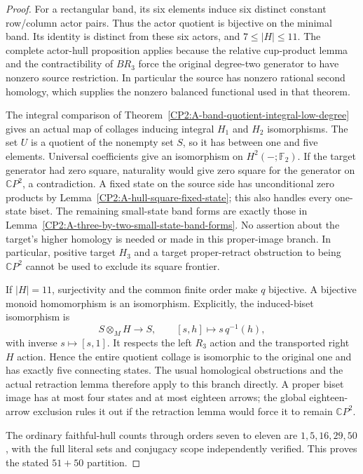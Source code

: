 \begin{proof}
For a rectangular band, its six elements induce six distinct constant
row/column actor pairs.  Thus the actor quotient is bijective on the
minimal band.  Its identity is distinct from these six actors, and
$7\leq|H|\leq11$.  The complete actor-hull proposition applies because
the relative cup-product lemma and the contractibility of $BR_3$
force the original degree-two generator to have nonzero source
restriction.  In particular the source has
nonzero rational second homology, which supplies the nonzero balanced
functional used in that theorem.

The integral comparison of
Theorem~\ref{CP2:A-band-quotient-integral-low-degree} gives an actual
map of collages inducing integral $H_1$ and $H_2$ isomorphisms.
The set $U$ is a quotient of the nonempty set $S$, so it has between
one and five elements.  Universal coefficients give an isomorphism
on $H^2(-;\mathbb F_2)$.  If the target generator had zero square,
naturality would give zero square for the generator on
$\mathbb CP^2$, a contradiction.  A fixed state on the source side
has unconditional zero products by
Lemma~\ref{CP2:A-hull-square-fixed-state}; this also handles every
one-state biset.  The remaining small-state band forms are exactly
those in Lemma~\ref{CP2:A-three-by-two-small-state-band-forms}.
No assertion about the target's higher homology is needed or made
in this proper-image branch.  In particular, positive target
$H_3$ and a target proper-retract obstruction to being
$\mathbb CP^2$ cannot be used to exclude its square frontier.

If $|H|=11$, surjectivity and the common finite order make $q$
bijective.  A bijective monoid homomorphism is an isomorphism.
Explicitly, the induced-biset isomorphism is
\[
 S\otimes_M H\longrightarrow S,
 \qquad [s,h]\longmapsto s\,q^{-1}(h),
\]
with inverse $s\mapsto[s,1]$.  It respects the left $R_3$ action
and the transported right $H$ action.  Hence the entire quotient
collage is isomorphic to the original one and has exactly five
connecting states.  The usual homological obstructions and the
actual retraction lemma therefore apply to this branch directly.
A proper biset image has at most four states and at most eighteen
arrows; the global eighteen-arrow exclusion rules it out if the
retraction lemma would force it to remain $\mathbb CP^2$.

The ordinary faithful-hull counts through orders seven to eleven
are $1,5,16,29,50$, with the full literal sets and conjugacy scope
independently verified.  This proves the stated $51+50$ partition.
\end{proof}

